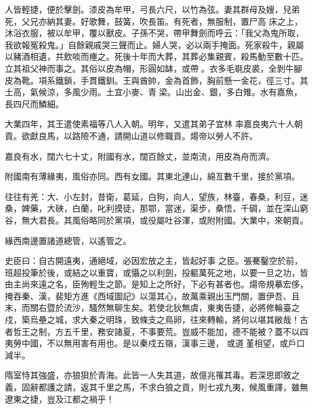 \begin{pinyinscope}
 人皆輕捷，便於擊劍。漆皮為牟甲，弓長六尺，以竹為弦。妻其群母及嫂，兒弟死，父兄亦納其妻。好歌舞，鼓簧，吹長笛。有死者，無服制，置尸高
 床之上，沐浴衣服，被以牟甲，覆以獸皮。子孫不哭，帶甲舞劍而呼云：「我父為鬼所取，我欲報冤殺鬼。」自餘親戚哭三聲而止。婦人哭，必以兩手掩面。死家殺牛，親屬以豬酒相遺，共飲啖而瘞之。死後十年而大葬，其葬必集親賓，殺馬動至數十匹。立其祖父神而事之。其俗以皮為帽，形圓如缽，或帶。衣多毛毼皮裘，全剝牛腳皮為靴。項系鐵鎖，手貫鐵釧。王與酋帥，金為首飾，胸前懸一金花，徑三寸。其土高，氣候涼，多風少雨。土宜小麥、青梁。山出金、銀，多白雉。水有嘉魚，長四尺而鱗細。



 大業四年，其王遣使素福等八人入朝。明年，又遣其弟子宜林
 率嘉良夷六十人朝貢。欲獻良馬，以路險不通，請開山道以修職貢。煬帝以勞人不許。



 嘉良有水，闊六七十丈，附國有水，闊百餘丈，並南流，用皮為舟而濟。



 附國南有薄緣夷，風俗亦同。西有女國。其東北連山，綿亙數千里，接於黨項。



 往往有羌：大、小左封，昔衛，葛延，白狗，向人，望族，林臺，春桑，利豆，迷桑，婢藥，大硤，白蘭，叱利摸徒，那鄂，當迷，渠步，桑悟，千碉，並在深山窮谷，無大君長。其風俗略同於黨項，或役屬吐谷渾，或附附國。大業中，來朝貢。



 緣西南邊置諸道總管，以遙管之。



 史臣曰：自古開遠夷，通絕域，必因宏放之主，皆起好事
 之臣。張騫鑿空於前，班超投筆於後，或結之以重寶，或懾之以利劍，投軀萬死之地，以要一旦之功，皆由主尚來遠之名，臣殉輕生之節。是知上之所好，下必有甚者也。煬帝規摹宏侈，掩吞秦、漢，裴矩方進《西域圖記》以蕩其心，故萬乘親出玉門關，置伊吾、且末，而關右暨於流沙，騷然無聊生矣。若使北狄無虞，東夷告捷，必將修輪臺之戍，築烏壘之城，求大秦之明珠，致條支之鳥卵，往來轉輸，將何以堪其敝哉！古者哲王之制，方五千里，務安諸夏，不事要荒。豈威不能加，德不能被？蓋不以四夷勞中國，不以無用害有用也。是以秦戍五嶺，漢事三邊，
 或道堇相望，或戶口減半。



 隋室恃其強盛，亦狼狽於青海。此皆一人失其道，故億兆罹其毒。若深思即敘之義，固辭都護之請，返其千里之馬，不求白狼之貢，則七戎九夷，候風重譯，雖無遼東之捷，豈及江都之禍乎！



\end{pinyinscope}